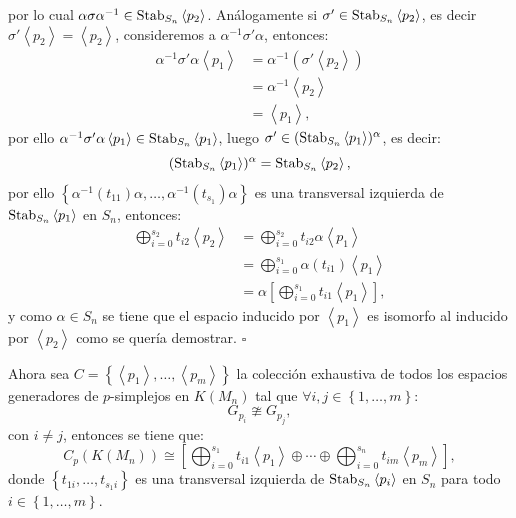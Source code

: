 \documentclass[12pt]{book}
\theoremstyle{definition}
\newcounter{in}
\begin{document}
por lo cual $\alpha \sigma \alpha^{-1} \in \textup{Stab}_{S_{n}}  \left \langle p_{2} \right \rangle$. Análogamente si $\sigma' \in \textup{Stab}_{S_{n}}  \left \langle p_{2} \right \rangle$, es decir $\sigma'  \left \langle p_{2} \right \rangle =  \left \langle p_{2} \right \rangle$, consideremos a $\alpha^{-1} \sigma' \alpha$, entonces:
\begin{equation*}
\begin{aligned}
\alpha^{-1} \sigma' \alpha  \left \langle p_{1} \right \rangle & = \alpha^{-1} (\sigma'  \left \langle p_{2} \right \rangle) \\
& = \alpha^{-1}  \left \langle p_{2} \right \rangle \\
& =  \left \langle p_{1} \right \rangle,
\end{aligned}
\end{equation*}
por ello $\alpha^{-1} \sigma' \alpha  \left \langle p_{1} \right \rangle \in \textup{Stab}_{S_{n}}  \left \langle p_{1} \right \rangle$, luego $\sigma' \in (\textup{Stab}_{S_{n}}  \left \langle p_{1} \right \rangle)^{\alpha}$, es decir:
$$(\textup{Stab}_{S_{n}}  \left \langle p_{1} \right \rangle)^{\alpha} = \textup{Stab}_{S_{n}}  \left \langle p_{2} \right \rangle,$$
por ello $\left \{ \alpha^{-1} (t_{11}) \alpha,\ldots, \alpha^{-1} (t_{s_{1}}) \alpha \right \}$ es una transversal izquierda de $\textup{Stab}_{S_{n}}  \left \langle p_{1} \right \rangle$ en $S_{n}$, entonces:
\begin{equation*}
\begin{aligned}
\bigoplus_{i=0}^{s_{2}} t_{i2} \left \langle p_{2} \right \rangle & = \bigoplus_{i=0}^{s_{2}} t_{i2} \alpha  \left \langle p_{1} \right \rangle \\
& = \bigoplus_{i=0}^{s_{1}} \alpha (t_{i1})  \left \langle p_{1} \right \rangle \\
& = \alpha \left [ \bigoplus_{i=0}^{s_{1}} t_{i1} \left \langle p_{1} \right \rangle \right ],
\end{aligned}
\end{equation*}
y como $\alpha \in S_{n}$ se tiene que el espacio inducido por $\left \langle p_{1} \right \rangle$ es isomorfo al inducido por $ \left \langle p_{2} \right \rangle$ como se quería demostrar. $\square$

Ahora sea $C = \left \{ \left \langle p_{1} \right \rangle,\ldots, \left \langle p_{m} \right \rangle \right \}$ la colección exhaustiva de todos los espacios generadores de $p$-simplejos en $K(M_{n})$ tal que $\forall i,j \in \left \{ 1,\ldots,m \right \}$:
$$G_{p_{i}} \ncong G_{p_{j}},$$
con $i \neq j$, entonces se tiene que:
$$C_{p}(K(M_{n})) \cong \left [ \bigoplus_{i=0}^{s_{1}} t_{i1} \left \langle p_{1} \right \rangle \oplus \cdots \oplus \bigoplus_{i=0}^{s_{n}} t_{im} \left \langle p_{m} \right \rangle \right ],$$
donde $\left \{ t_{1i}, \ldots, t_{s_{1}i} \right \}$ es una transversal izquierda de $\textup{Stab}_{S_{n}}  \left \langle p_{i} \right \rangle$ en $S_{n}$ para todo $i \in \left \{ 1,\ldots,m \right \}.$
\end{document}
